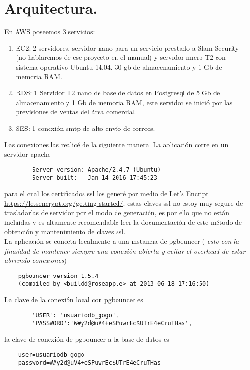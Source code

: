 \documentclass[10pt,a4paper]{book}
\begin{document}
	\section{Arquitectura.}
	En AWS poseemos 3 servicios:
	\begin{enumerate}
		\item EC2: 2 servidores, servidor nano para un servicio prestado a Slam Security (no hablaremos de ese proyecto en el manual) y servidor micro T2 con sistema operativo Ubuntu 14.04. 30 gb de almacenamiento y 1 Gb de memoria RAM.
		\item RDS: 1 Servidor T2 nano de base de datos en Postgresql de 5 Gb de almacenamiento y 1 Gb de memoria RAM, este servidor se inició por las previsiones de ventas del área comercial.
		\item SES: 1 conexión smtp de alto envío de correos.
	\end{enumerate}
	
	Las conexiones las realicé de la siguiente manera. La aplicación corre en un servidor apache
	\begin{verbatim}
		Server version: Apache/2.4.7 (Ubuntu)
		Server built:   Jan 14 2016 17:45:23
	\end{verbatim}
	para el cual los certificados ssl los generé por medio de Let's Encript \url{https://letsencrypt.org/getting-started/}. estas claves ssl no estoy muy seguro de trasladarlas de servidor por el modo de generación, es por ello que no están incluidas y es altamente recomendable leer la documentación de este método de obtención  y mantenimiento de claves ssl.\\
	
	La aplicación se conecta localmente a una instancia de pgbouncer ( \textit{esto con la finalidad de mantener siempre una conexión abierta y evitar el overhead de estar abriendo conexiones})
	\begin{verbatim}
	pgbouncer version 1.5.4
	(compiled by <buildd@roseapple> at 2013-06-18 17:16:50)
	\end{verbatim}
	
	La clave de la conexión local con pgbouncer es
	\begin{verbatim}
		'USER': 'usuariodb_gogo',
		'PASSWORD':'W#y2d@uV4+eSPuwrEc$UTrE4eCruTHas',
	\end{verbatim}
	
	la clave de conexión de pgbouncer a la base de datos es
	\begin{verbatim}
	user=usuariodb_gogo
	password=W#y2d@uV4+eSPuwrEc$UTrE4eCruTHas
	\end{verbatim}
	
\end{document}
